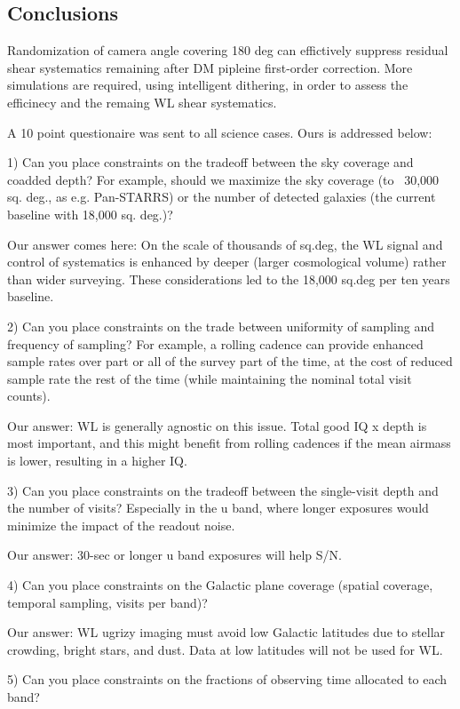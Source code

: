 \subsection{Conclusions}

Randomization of camera angle covering 180 deg can effictively suppress residual shear systematics
remaining after DM pipleine first-order correction.   More simulations are required, using intelligent dithering,
in order to assess the efficinecy and the remaing WL shear systematics.

A 10 point questionaire was sent to all science cases. Ours is addressed below:

1) Can you place constraints on the tradeoff between the sky coverage and coadded depth?
For example, should we maximize the sky coverage (to ~30,000 sq. deg., as e.g. Pan-STARRS)
or the number of detected galaxies (the current baseline with 18,000 sq. deg.)?

Our answer comes here: On the scale of thousands of sq.deg, the WL signal and control of systematics is enhanced by deeper (larger cosmological volume) rather than wider surveying. These considerations led to the 18,000 sq.deg per ten years baseline.

2) Can you place constraints on the trade between uniformity of sampling and frequency of 
sampling? For example, a rolling cadence can provide enhanced sample rates over part or all 
of the survey part of the time, at the cost of reduced sample rate the rest of the time (while 
maintaining the nominal total visit counts).

Our answer: WL is generally agnostic on this issue. Total good IQ x depth is most important, and this might benefit from rolling cadences if the mean airmass is lower, resulting in a higher IQ.

3) Can you place constraints on the tradeoff between the single-visit depth and the number 
of visits? Especially in the u band, where longer exposures would minimize the impact of the 
readout noise.

Our answer: 30-sec or longer u band exposures will help S/N.

4) Can you place constraints on the Galactic plane coverage (spatial coverage, temporal 
sampling, visits per band)?

Our answer: WL ugrizy imaging must avoid low Galactic latitudes due to stellar crowding, bright stars, and dust. Data at low latitudes will not be used for WL.

5) Can you place constraints on the fractions of observing time allocated to each band?

